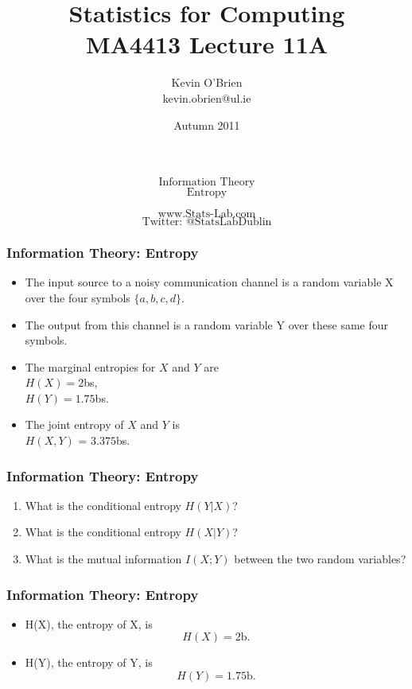﻿\documentclass[a4]{beamer}
\title[MA4413]{Statistics for Computing \\ {\normalsize MA4413 Lecture 11A}}
\author[Kevin O'Brien]{Kevin O'Brien \\ {\scriptsize kevin.obrien@ul.ie}}
\date{Autumn 2011}
\begin{document}
\begin{frame}
\Huge
\[\mbox{Information Theory}\]
\[\mbox{Entropy}\]

\Large
\[\mbox{www.Stats-Lab.com}\]
\[\mbox{Twitter: @StatsLabDublin}\]
\end{frame}
\begin{frame}
\frametitle{Information Theory: Entropy}
\Large
\vspace{-0.5cm}
\begin{itemize}
\item The input source to a noisy communication channel is a random variable X over the
four symbols $\{a, b, c, d\}$. \item  The output from this channel is a random variable Y over these same
four symbols.
\item The marginal entropies for $X$ and $Y$ are \\$H(X)=2$bs, \\$H(Y)=1.75$bs.
\item The joint entropy of $X$ and $Y$ is\\  $H(X,Y)$ = $3.375$bs.
\end{itemize}
\end{frame}

\begin{frame}
\frametitle{Information Theory: Entropy}
\Large
\begin{enumerate}
\item What is the conditional entropy $H(Y|X)$?
\item What is the conditional entropy $H(X|Y)$?
\item What is the mutual information $I(X;Y)$ between the two random variables?
\end{enumerate}
\end{frame}



\begin{frame}
\frametitle{Information Theory: Entropy}
\Large
\begin{itemize}
\item H(X), the entropy of X, is 
\[H(X) = 2 \mbox{b}.\] 
\item H(Y), the entropy of Y, is 
\[H(Y) = 1.75 \mbox{b}.\] 
\end{itemize}
\end{frame}
\end{document}
